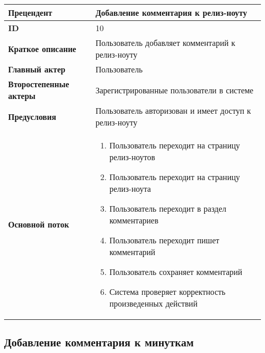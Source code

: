 \documentclass[14pt,a4paper]{extarticle}
\begin{document}
\begin{tabular}{|l|p{9cm}|}
	\hline
	\textbf{Прецендент}            & Добавление комментария к релиз-ноуту                       \\
	\hline
	\textbf{ID}                    & 10                                                         \\
	\hline
	\textbf{Краткое описание}      & Пользователь добавляет комментарий к релиз-ноуту           \\
	\hline
	\textbf{Главный актер}         & Пользователь                                               \\
	\hline
	\textbf{Второстепенные актеры} & Зарегистрированные пользователи в системе                  \\
	\hline
	\textbf{Предусловия}           & Пользователь авторизован и имеет доступ к релиз-ноуту      \\
	\hline
	\textbf{Основной поток}        & \begin{enumerate}
		                                 \item Пользователь переходит на страницу релиз-ноутов
		                                 \item Пользователь переходит на страницу релиз-ноута
		                                 \item Пользователь переходит в раздел комментариев
		                                 \item Пользователь переходит пишет комментарий
		                                 \item Пользователь сохраняет комментарий
		                                 \item Система проверяет корректность произведенных действий
	                                 \end{enumerate} \\
	\hline
\end{tabular}

\subsection{Добавление комментария к минуткам}
\end{document}
